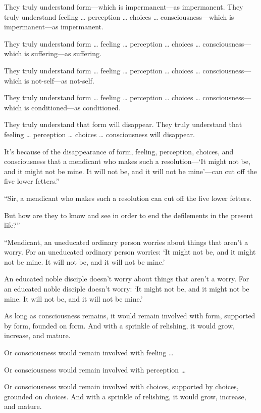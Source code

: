 \documentclass[12pt,openany]{book}%
\begin{document}
They truly understand form—which is impermanent—as impermanent. They truly understand feeling … perception … choices … consciousness—which is impermanent—as impermanent. 

They truly understand form … feeling … perception … choices … consciousness—which is suffering—as suffering. 

They truly understand form … feeling … perception … choices … consciousness—which is not-self—as not-self. 

They truly understand form … feeling … perception … choices … consciousness—which is conditioned—as conditioned. 

They truly understand that form will disappear. They truly understand that feeling … perception … choices … consciousness will disappear. 

It’s because of the disappearance of form, feeling, perception, choices, and consciousness that a mendicant who makes such a resolution—‘It might not be, and it might not be mine. It will not be, and it will not be mine’—can cut off the five lower fetters.” 

“Sir, a mendicant who makes such a resolution can cut off the five lower fetters. 

But how are they to know and see in order to end the defilements in the present life?” 

“Mendicant, an uneducated ordinary person worries about things that aren’t a worry. For an uneducated ordinary person worries: ‘It might not be, and it might not be mine. It will not be, and it will not be mine.’ 

An educated noble disciple doesn’t worry about things that aren’t a worry. For an educated noble disciple doesn’t worry: ‘It might not be, and it might not be mine. It will not be, and it will not be mine.’ 

As long as consciousness remains, it would remain involved with form, supported by form, founded on form. And with a sprinkle of relishing, it would grow, increase, and mature. 

Or consciousness would remain involved with feeling … 

Or consciousness would remain involved with perception … 

Or consciousness would remain involved with choices, supported by choices, grounded on choices. And with a sprinkle of relishing, it would grow, increase, and mature. 
\end{document}
